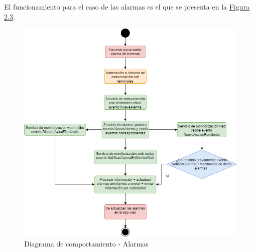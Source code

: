 El funcionamiento para el caso de las alarmas es el que se presenta en la \hyperref[fig:flujograma-alarmas]{Figura 2.3}.

\begin{figure}[H]
    \centering
    \includegraphics[width=15cm]{Imagenes/Flujograma-alarmas.png}
    \caption{Diagrama de comportamiento - Alarmas}
    \label{fig:flujograma-alarmas}
\end{figure}

